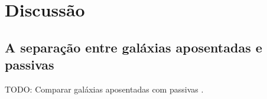 \section{Discussão}

\subsection{A separação entre galáxias aposentadas e passivas}

TODO: Comparar galáxias aposentadas com passivas
\citep[In prep. perpetuum]{Mateus2013}.


